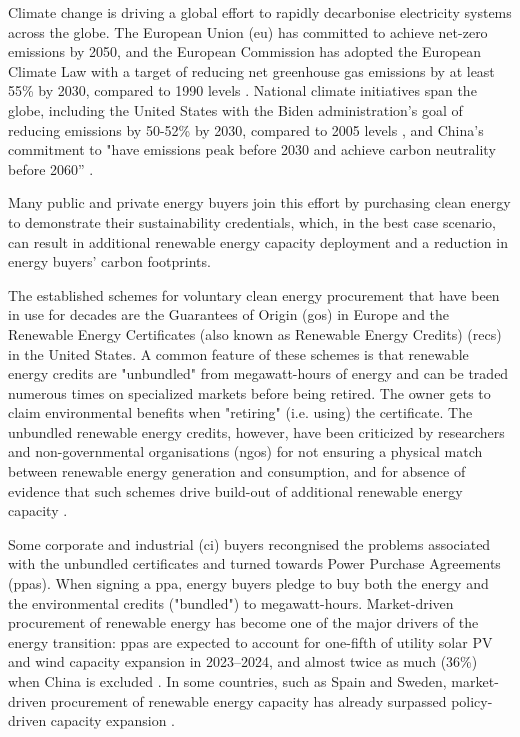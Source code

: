 

Climate change is driving a global effort to rapidly decarbonise electricity systems across the globe. 
The European Union (\gls{eu}) has committed to achieve net-zero emissions by 2050, and the European Commission has adopted the European Climate Law with a target of reducing net greenhouse gas emissions by at least 55\% by 2030, compared to 1990 levels \cite{EuropeanClimateLaw2020}. 
National climate initiatives span the globe, including the United States with the Biden administration's goal of reducing emissions by 50-52\% by 2030, compared to 2005 levels \cite{BidenClimatePlan2021}, and China's commitment to "have \co emissions peak before 2030 and achieve carbon neutrality before 2060” \cite{ChinaNetZero-IEA}.


Many public and private energy buyers join this effort by purchasing clean energy to demonstrate their sustainability credentials, which, in the best case scenario, can result in additional renewable energy capacity deployment and a reduction in energy buyers' carbon footprints.

The established schemes for voluntary clean energy procurement that have been in use for decades are the Guarantees of Origin (\gls{go}s) in Europe and the Renewable Energy Certificates (also known as Renewable Energy Credits) (\gls{rec}s) in the United States.
A common feature of these schemes is that renewable energy credits are "unbundled" from megawatt-hours of energy and can be traded numerous times on specialized markets before being retired.
The owner gets to claim environmental benefits when "retiring" (i.e. using) the certificate.
The unbundled renewable energy credits, however, have been criticized by researchers and non-governmental organisations (\gls{ngo}s) for not ensuring a physical match between renewable energy generation and consumption, and for absence of evidence that such schemes drive build-out of additional renewable energy capacity \cite{bjorn-RECSnatcom-2022, gillenwater-2014, re100report-2020, spglobal-recs, bock-icelandGOproblem}.

Some corporate and industrial (\gls{ci}) buyers recongnised the problems associated with the unbundled certificates and turned towards Power Purchase Agreements (\gls{ppa}s). 
When signing a \gls{ppa}, energy buyers pledge to buy both the energy and the environmental credits ("bundled") to megawatt-hours.
Market-driven procurement of renewable energy has become one of the major drivers of the energy transition: \gls{ppa}s are expected to account for one-fifth of utility solar PV and wind capacity expansion in 2023--2024, and almost twice as much (36\%) when China is excluded \cite{iea-REppa2023}.
In some countries, such as Spain and Sweden, market-driven procurement of renewable energy capacity has already surpassed policy-driven capacity expansion \cite{iea-REppa2023}.

